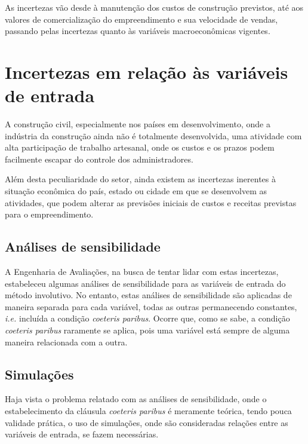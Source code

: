 \documentclass[
	12pt,				%
	oneside,			%
	a4paper,			%
	chapter=TITLE,		%
	section=TITLE,		%
	english,			%
	brazil				%
	]{abntex2}
\begin{document}
As incertezas vão desde à manutenção dos custos de construção previstos, até aos
valores de comercialização do empreendimento e sua velocidade de vendas,
passando pelas incertezas quanto às variáveis macroeconômicas vigentes.

\hypertarget{incertezas-em-relauxe7uxe3o-uxe0s-variuxe1veis-de-entrada}{%
\section{Incertezas em relação às variáveis de entrada}\label{incertezas-em-relauxe7uxe3o-uxe0s-variuxe1veis-de-entrada}}

A construção civil, especialmente nos países em desenvolvimento, onde a
indústria da construção ainda não é totalmente desenvolvida, uma atividade com
alta participação de trabalho artesanal, onde os custos e os prazos podem
facilmente escapar do controle dos administradores.

Além desta peculiaridade do setor, ainda existem as incertezas inerentes à
situação econômica do país, estado ou cidade em que se desenvolvem as atividades,
que podem alterar as previsões iniciais de custos e receitas previstas para o
empreendimento.

\hypertarget{anuxe1lises-de-sensibilidade}{%
\subsection{Análises de sensibilidade}\label{anuxe1lises-de-sensibilidade}}

A Engenharia de Avaliações, na busca de tentar lidar com estas incertezas,
estabeleceu algumas análises de sensibilidade para as variáveis de entrada do
método involutivo. No entanto, estas análises de sensibilidade são aplicadas
de maneira separada para cada variável, todas as outras permanecendo constantes,
\emph{i.e.} incluída a condição \emph{coeteris paribus}. Ocorre que, como se sabe, a
condição \emph{coeteris paribus} raramente se aplica, pois uma variável está
sempre de alguma maneira relacionada com a outra.

\hypertarget{simulauxe7uxf5es}{%
\subsection{Simulações}\label{simulauxe7uxf5es}}

Haja vista o problema relatado com as análises de sensibilidade, onde o
estabelecimento da cláusula \emph{coeteris paribus} é meramente teórica, tendo
pouca validade prática, o uso de simulações, onde são consideradas relações
entre as variáveis de entrada, se fazem necessárias.
\end{document}
